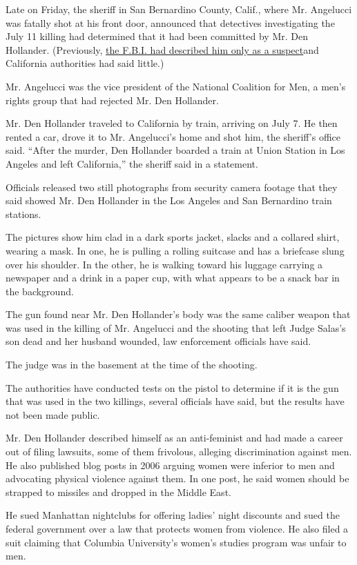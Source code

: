 Late on Friday, the sheriff in San Bernardino County, Calif., where Mr.
Angelucci was fatally shot at his front door, announced that detectives
investigating the July 11 killing had determined that it had been
committed by Mr. Den Hollander. (Previously,
\href{https://www.nytimes.com/2020/07/22/nyregion/roy-den-hollander-esther-salas.html}{the
F.B.I. had described him only as a suspect}and California authorities
had said little.)

Mr. Angelucci was the vice president of the National Coalition for Men,
a men's rights group that had rejected Mr. Den Hollander.

Mr. Den Hollander traveled to California by train, arriving on July 7.
He then rented a car, drove it to Mr. Angelucci's home and shot him, the
sheriff's office said. ``After the murder, Den Hollander boarded a train
at Union Station in Los Angeles and left California,'' the sheriff said
in a statement.

Officials released two still photographs from security camera footage
that they said showed Mr. Den Hollander in the Los Angeles and San
Bernardino train stations.

The pictures show him clad in a dark sports jacket, slacks and a
collared shirt, wearing a mask. In one, he is pulling a rolling suitcase
and has a briefcase slung over his shoulder. In the other, he is walking
toward his luggage carrying a newspaper and a drink in a paper cup, with
what appears to be a snack bar in the background.

The gun found near Mr. Den Hollander's body was the same caliber weapon
that was used in the killing of Mr. Angelucci and the shooting that left
Judge Salas's son dead and her husband wounded, law enforcement
officials have said.

The judge was in the basement at the time of the shooting.

The authorities have conducted tests on the pistol to determine if it is
the gun that was used in the two killings, several officials have said,
but the results have not been made public.

Mr. Den Hollander described himself as an anti-feminist and had made a
career out of filing lawsuits, some of them frivolous, alleging
discrimination against men. He also published blog posts in 2006 arguing
women were inferior to men and advocating physical violence against
them. In one post, he said women should be strapped to missiles and
dropped in the Middle East.

He sued Manhattan nightclubs for offering ladies' night discounts and
sued the federal government over a law that protects women from
violence. He also filed a suit claiming that Columbia University's
women's studies program was unfair to men.

